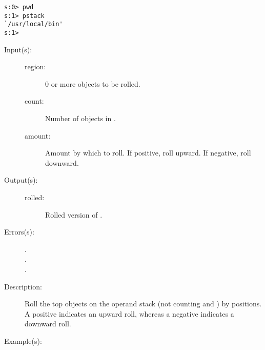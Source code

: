 \begin{description}
\begin{description}
\begin{verbatim}
s:0> pwd
s:1> pstack
`/usr/local/bin'
s:1>
		\end{verbatim}
	\end{description}
\label{systemdict:roll}
\item[{\stilop{region count amount}{roll}{rolled}}: ]
	\begin{description}\item[]
	\item[Input(s): ]
		\begin{description}\item[]
		\item[region: ]
			0 or more objects to be rolled.
		\item[count: ]
			Number of objects in .
		\item[amount: ]
			Amount by which to roll.  If positive, roll
			upward.  If negative, roll downward.
		\end{description}
	\item[Output(s): ]
		\begin{description}\item[]
		\item[rolled: ]
			Rolled version of .
		\end{description}
	\item[Errors(s): ]
		\begin{description}\item[]
		\item[.]
		\item[.]
		\item[.]
		\end{description}
	\item[Description: ]
		Roll the top  objects on the operand stack
		(not counting  and ) by
		 positions.  A positive 
		indicates an upward roll, whereas a negative 
		indicates a downward roll.
	\item[Example(s): ]\begin{verbatim}


\end{verbatim}
\end{description}
\end{description}
